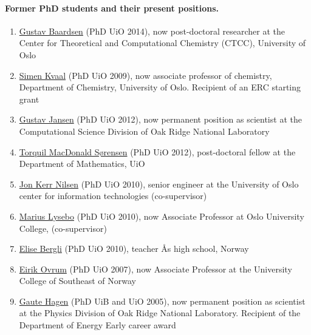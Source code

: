 \documentclass[%
oneside,                 %
final,                   %
10pt]{article}
\begin{document}
\noindent
\paragraph{Former PhD students and their present positions.}
\begin{enumerate}
\item \href{{http://www.ctcc.no/people/postdocs/gba/}}{Gustav Baardsen} (PhD UiO 2014), now post-doctoral researcher at the Center for Theoretical and Computational Chemistry (CTCC), University of Oslo 

\item \href{{http://www.mn.uio.no/kjemi/english/people/aca/simenkv/index.html}}{Simen Kvaal} (PhD UiO 2009), now associate professor of chemistry, Department of Chemistry, University of Oslo. Recipient of an ERC starting grant

\item \href{{https://www.ornl.gov/staff-profile/gustav-r-jansen}}{Gustav Jansen} (PhD UiO 2012), now permanent position as scientist at the Computational Science Division of Oak Ridge National Laboratory  

\item \href{{http://www.mn.uio.no/math/english/people/aca/tmac/}}{Torquil MacDonald Sørensen} (PhD UiO 2012), post-doctoral fellow at the Department of Mathematics, UiO

\item \href{{http://www.usit.uio.no/english/about/organisation/bps/rc/ris/staff/jonkni/}}{Jon Kerr Nilsen} (PhD UiO 2010), senior engineer at the University of Oslo center for information technologies (co-supervisor)

\item \href{{https://www.hioa.no/tilsatt/marlys}}{Marius Lysebo} (PhD UiO 2010), now Associate Professor at Oslo University College, (co-supervisor)

\item \href{{http://www.aas.vgs.no/om-oss/organisasjon/alle-ansatte/}}{Elise Bergli} (PhD UiO 2010), teacher Ås high school, Norway

\item \href{{https://www.hbv.no/om-hbv-kontakt-oss-ansatte/eirik-ovrum-article125026-6688.html}}{Eirik Ovrum} (PhD UiO 2007), now Associate Professor at the University College of Southeast of Norway

\item \href{{https://www.ornl.gov/staff-profile/gaute-hagen}}{Gaute Hagen} (PhD UiB and UiO 2005), now permanent position as scientist at the Physics Division of Oak Ridge National Laboratory. Recipient of the Department of Energy Early career award


\end{enumerate}
\end{document}

